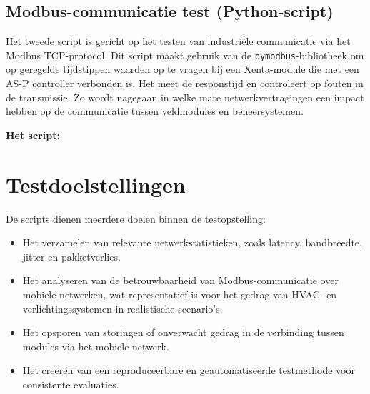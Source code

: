 \subsection*{Modbus-communicatie test (Python-script)}

Het tweede script is gericht op het testen van industriële communicatie via het Modbus TCP-protocol. Dit script maakt gebruik van de \texttt{pymodbus}-bibliotheek om op geregelde tijdstippen waarden op te vragen bij een Xenta-module die met een AS-P controller verbonden is. Het meet de responstijd en controleert op fouten in de transmissie. Zo wordt nagegaan in welke mate netwerkvertragingen een impact hebben op de communicatie tussen veldmodules en beheersystemen.

\textbf{Het script:}
%    
%    

\section{Testdoelstellingen}

De scripts dienen meerdere doelen binnen de testopstelling:
\begin{itemize}
    \item Het verzamelen van relevante netwerkstatistieken, zoals latency, bandbreedte, jitter en pakketverlies.
    \item Het analyseren van de betrouwbaarheid van Modbus-communicatie over mobiele netwerken, wat representatief is voor het gedrag van HVAC- en verlichtingssystemen in realistische scenario’s.
    \item Het opsporen van storingen of onverwacht gedrag in de verbinding tussen modules via het mobiele netwerk.
    \item Het creëren van een reproduceerbare en geautomatiseerde testmethode voor consistente evaluaties.
\end{itemize}

